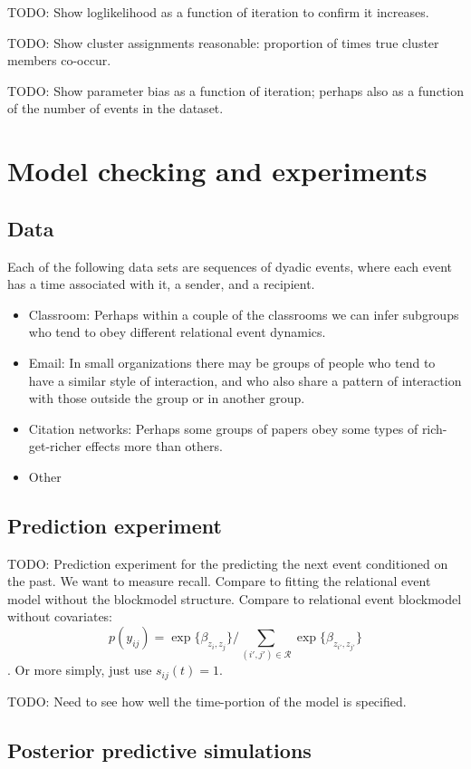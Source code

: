 \documentclass[11pt]{article}
\begin{document}
TODO: Show loglikelihood as a function of iteration to confirm it increases.

TODO: Show cluster assignments reasonable: proportion of times true cluster members co-occur.

TODO: Show parameter bias as a function of iteration; perhaps also as a function of the number of events in the dataset.

\section{Model checking and experiments}

\subsection*{Data}

Each of the following data sets are sequences of dyadic events, where each event has a time associated with it, a sender, and a recipient.

\begin{itemize}
\item Classroom:  Perhaps within a couple of the classrooms we can infer subgroups who tend to obey different relational event dynamics.
\item Email: In small organizations there may be groups of people who tend to have a similar style of interaction, and who also share a pattern of interaction with those outside the group or in another group.
\item Citation networks: Perhaps some groups of papers obey some types of rich-get-richer effects more than others.
\item Other
\end{itemize}

\subsection*{Prediction experiment}
TODO: Prediction experiment for the predicting the next event conditioned on the past.  We want to measure recall.  Compare to fitting the relational event model without the blockmodel structure.  Compare to relational event blockmodel without covariates: $$p(y_{ij}) = \exp\{\beta_{z_i,z_j}\} / \sum_{(i',j') \in \mathcal{R}}\exp\{\beta_{z_{i'},z_{j'}}\} $$.
Or more simply, just use $s_{ij}(t) = 1$.

TODO: Need to see how well the time-portion of the model is specified.

\subsection*{Posterior predictive simulations}
\end{document}
